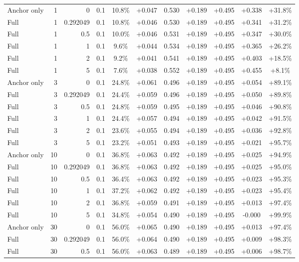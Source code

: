 \begin{table}[htbp]
\begin{tabular}{lrrrccccccc}
Anchor only & 1 & 0 & 0.1 & 10.8\% & +0.047 & 0.530 & +0.189 & +0.495 & +0.338 & +31.8\% \\
Full & 1 & 0.292049 & 0.1 & 10.8\% & +0.046 & 0.530 & +0.189 & +0.495 & +0.341 & +31.2\% \\
Full & 1 & 0.5 & 0.1 & 10.0\% & +0.046 & 0.531 & +0.189 & +0.495 & +0.347 & +30.0\% \\
Full & 1 & 1 & 0.1 & 9.6\% & +0.044 & 0.534 & +0.189 & +0.495 & +0.365 & +26.2\% \\
Full & 1 & 2 & 0.1 & 9.2\% & +0.041 & 0.541 & +0.189 & +0.495 & +0.403 & +18.5\% \\
Full & 1 & 5 & 0.1 & 7.6\% & +0.038 & 0.552 & +0.189 & +0.495 & +0.455 & +8.1\% \\
Anchor only & 3 & 0 & 0.1 & 24.8\% & +0.061 & 0.496 & +0.189 & +0.495 & +0.054 & +89.1\% \\
Full & 3 & 0.292049 & 0.1 & 24.4\% & +0.059 & 0.496 & +0.189 & +0.495 & +0.050 & +89.8\% \\
Full & 3 & 0.5 & 0.1 & 24.8\% & +0.059 & 0.495 & +0.189 & +0.495 & +0.046 & +90.8\% \\
Full & 3 & 1 & 0.1 & 24.4\% & +0.057 & 0.494 & +0.189 & +0.495 & +0.042 & +91.5\% \\
Full & 3 & 2 & 0.1 & 23.6\% & +0.055 & 0.494 & +0.189 & +0.495 & +0.036 & +92.8\% \\
Full & 3 & 5 & 0.1 & 23.2\% & +0.051 & 0.493 & +0.189 & +0.495 & +0.021 & +95.7\% \\
Anchor only & 10 & 0 & 0.1 & 36.8\% & +0.063 & 0.492 & +0.189 & +0.495 & +0.025 & +94.9\% \\
Full & 10 & 0.292049 & 0.1 & 36.8\% & +0.063 & 0.492 & +0.189 & +0.495 & +0.025 & +95.0\% \\
Full & 10 & 0.5 & 0.1 & 36.4\% & +0.063 & 0.492 & +0.189 & +0.495 & +0.023 & +95.3\% \\
Full & 10 & 1 & 0.1 & 37.2\% & +0.062 & 0.492 & +0.189 & +0.495 & +0.023 & +95.4\% \\
Full & 10 & 2 & 0.1 & 36.8\% & +0.059 & 0.491 & +0.189 & +0.495 & +0.013 & +97.4\% \\
Full & 10 & 5 & 0.1 & 34.8\% & +0.054 & 0.490 & +0.189 & +0.495 & -0.000 & +99.9\% \\
Anchor only & 30 & 0 & 0.1 & 56.0\% & +0.065 & 0.490 & +0.189 & +0.495 & +0.013 & +97.4\% \\
Full & 30 & 0.292049 & 0.1 & 56.0\% & +0.064 & 0.490 & +0.189 & +0.495 & +0.009 & +98.3\% \\
Full & 30 & 0.5 & 0.1 & 56.0\% & +0.063 & 0.489 & +0.189 & +0.495 & +0.006 & +98.7\% \\

\end{tabular}
\end{table}
